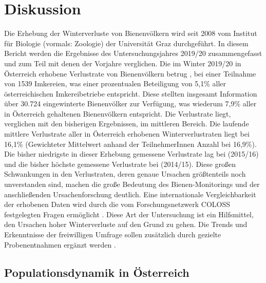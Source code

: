 \section{Diskussion}

Die Erhebung der Winterverluste von Bienenvölkern wird seit 2008 vom Institut für Biologie (vormals: Zoologie) der Universität Graz durchgeführt. In diesem Bericht werden die Ergebnisse des Untersuchungsjahres 2019/20 zusammengefasst und zum Teil mit denen der Vorjahre verglichen. Die im Winter 2019/20 in Österreich erhobene Verlustrate von Bienenvölkern betrug , bei einer Teilnahme von 1539 Imkereien, was einer prozentualen Beteiligung von 5,1\% aller österreichischen Imkereibetriebe entspricht. Diese stellten insgesamt Information über 30.724 eingewinterte Bienenvölker zur Verfügung, was wiederum 7,9\% aller in Österreich gehaltenen Bienenvölkern entspricht. Die Verlustrate liegt, verglichen mit den bisherigen Ergebnissen, im mittleren Bereich. Die laufende mittlere Verlustrate aller in Österreich erhobenen Winterverlustraten liegt bei 16,1\% (Gewichteter Mittelwert anhand der TeilnehmerInnen Anzahl bei 16,9\%). Die bisher niedrigste in dieser Erhebung gemessene Verlustrate lag bei  (2015/16) und die bisher höchste gemessene Verlustrate bei  (2014/15). Diese großen Schwankungen in den Verlustraten, deren genaue Ursachen größtenteils noch unverstanden sind, machen die große Bedeutung des Bienen-Monitorings und der anschließenden Ursachenforschung deutlich. Eine internationale Vergleichbarkeit der erhobenen Daten wird durch die vom Forschungsnetzwerk COLOSS festgelegten Fragen ermöglicht \citep{brodschneider2016,brodschneider2018,vanderzee2013}. Diese Art der Untersuchung ist ein Hilfsmittel, den Ursachen hoher Winterverluste auf den Grund zu gehen. Die Trends und Erkenntnisse der freiwilligen Umfrage sollen zusätzlich durch gezielte Probenentnahmen ergänzt werden \citep{vanderzee2015}.

\subsection{Populationsdynamik in Österreich}

